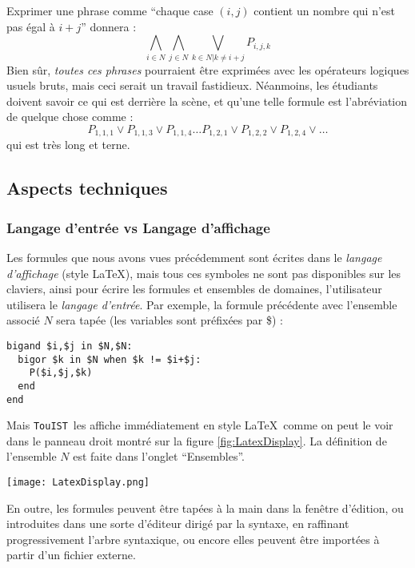\documentclass{iaf}
\newcommand{\nameTool}{{\sc \texttt {TouIST}}}
\begin{document}
Exprimer une phrase comme ``chaque case $(i,j)$ contient un nombre qui n'est pas \'egal \`a $i+j$'' donnera :
$$\bigwedge_{i \in N } \bigwedge_{j \in N} \bigvee_{k \in N|k\neq i+j} P_{i,j,k}$$
Bien s\^ur, \emph{toutes ces phrases} pourraient \^etre exprim\'ees avec les op\'erateurs logiques usuels bruts, mais ceci serait un travail fastidieux. N\'eanmoins, les \'etudiants doivent savoir ce qui est derri\`ere la sc\`ene, et qu'une telle formule est l'abr\'eviation de quelque chose comme :
$$P_{1,1,1}\vee P_{1,1,3}\vee P_{1,1,4}\ldots P_{1,2,1}\vee P_{1,2,2}\vee P_{1,2,4}\vee \ldots $$
qui est tr\`es long et terne.



\subsection{Aspects techniques}

\subsubsection*{Langage d'entr\'ee vs Langage d'affichage}

Les formules que nous avons vues pr\'ec\'edemment sont \'ecrites dans le \emph{langage d'affichage} (style \LaTeX), mais tous ces symboles ne sont pas disponibles sur les claviers, ainsi pour \'ecrire les formules et ensembles de domaines, l'utilisateur utilisera le \emph{langage d'entr\'ee}.
Par exemple, la formule pr\'ec\'edente avec l'ensemble associ\'e $N$ sera tap\'ee (les variables sont pr\'{e}fix\'{e}es par \$) :
\begin{verbatim}
bigand $i,$j in $N,$N:
  bigor $k in $N when $k != $i+$j:
    P($i,$j,$k)
  end
end
\end{verbatim}
Mais \nameTool\ les affiche imm\'ediatement en style \LaTeX\ comme on peut le voir dans le panneau droit montr\'{e} sur la figure \ref{fig:LatexDisplay}.
La d\'{e}finition de l'ensemble $N$ est faite dans l'onglet ``Ensembles''.

\begin{figure*}[htbp]
\centering
\texttt{[image: LatexDisplay.png]}
  \caption{Affichage en style \LaTeX}
  \label{fig:LatexDisplay}
\end{figure*}


En outre, les formules peuvent \^etre tap\'ees \`a la main dans la fen\^etre d'\'edition, ou introduites dans une sorte d'\'editeur dirig\'e par la syntaxe, en raffinant progressivement l'arbre syntaxique, ou encore elles peuvent \^etre import\'ees \`a partir d'un fichier externe.
\end{document}
